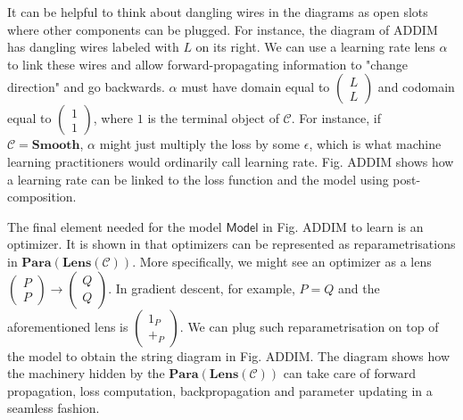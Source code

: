 \documentclass[11pt,a4paper,openright,twoside]{report}
\theoremstyle{plain}
\theoremstyle{definition}
\begin{document}
It can be helpful to think about dangling wires in the diagrams as open slots where other components can be plugged. For instance, the diagram of ADDIM has dangling wires labeled with $L$ on its right. We can use a learning rate lens $\alpha$ to link these wires and allow forward-propagating information to "change direction" and go backwards. $\alpha$ must have domain equal to $\left( \begin{smallmatrix} L \\ L \end{smallmatrix} \right)$ and codomain equal to $\left(\begin{smallmatrix} 1 \\ 1 \end{smallmatrix}\right)$, where $1$ is the terminal object of $\mathcal{C}$. For instance, if $\mathcal{C} = \mathbf{Smooth}$, $\alpha$ might just multiply the loss by some $\epsilon$, which is what machine learning practitioners would ordinarily call learning rate. Fig. ADDIM shows how a learning rate can be linked to the loss function and the model using post-composition.


The final element needed for the model $\mathsf{Model}$ in Fig. ADDIM to learn is an optimizer. It is shown in \cite{cruttwell2022categorical} that optimizers can be represented as reparametrisations in $\mathbf{Para}(\mathbf{Lens}(\mathcal{C}))$. More specifically, we might see an optimizer as a lens $\left( \begin{smallmatrix} P \\ P \end{smallmatrix} \right) \to \left( \begin{smallmatrix} Q \\ Q \end{smallmatrix} \right)$. In gradient descent, for example, $P = Q$ and the aforementioned lens is $\left( \begin{smallmatrix} 1_P \\ +_P \end{smallmatrix} \right)$. We can plug such reparametrisation on top of the model to obtain the string diagram in Fig. ADDIM. The diagram shows how the machinery hidden by the $\mathbf{Para}(\mathbf{Lens}(\mathcal{C}))$ can take care of forward propagation, loss computation, backpropagation and parameter updating in a seamless fashion.
\end{document}
